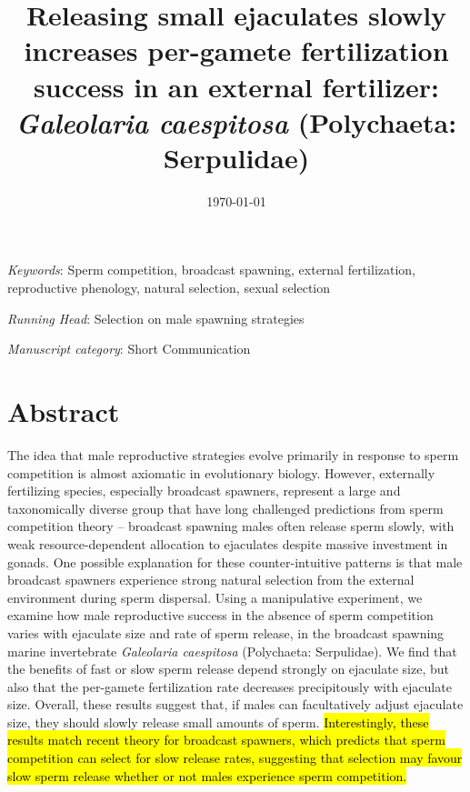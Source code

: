 \documentclass{article}
\title{Releasing small ejaculates slowly increases per-gamete fertilization success in an external fertilizer: \textit{Galeolaria caespitosa} (Polychaeta: Serpulidae)}
\date{\today}
\begin{document}
\maketitle




\noindent{} \textit{Keywords}: Sperm competition, broadcast spawning, external fertilization, reproductive phenology, natural selection, sexual selection
\bigskip

\noindent{} \textit{Running Head}: Selection on male spawning strategies

\bigskip

\noindent{} \textit{Manuscript category}: Short Communication

\bigskip


\linenumbers
\modulolinenumbers[1]
\renewcommand\linenumberfont{\normalfont\small}
\newpage{}



\section{Abstract}

\noindent{} The idea that male reproductive strategies evolve primarily in response to sperm competition is almost axiomatic in evolutionary biology. However, externally fertilizing species, especially broadcast spawners, represent a large and taxonomically diverse group that have long challenged predictions from sperm competition theory -- broadcast spawning males often release sperm slowly, with weak resource-dependent allocation to ejaculates despite massive investment in gonads. One possible explanation for these counter-intuitive patterns is that male broadcast spawners experience strong natural selection from the external environment during sperm dispersal. Using a manipulative experiment, we examine how male reproductive success in the absence of sperm competition varies with ejaculate size and rate of sperm release, in the broadcast spawning marine invertebrate \textit{Galeolaria caespitosa} (Polychaeta: Serpulidae). We find that the benefits of fast or slow sperm release depend strongly on ejaculate size, but also that the per-gamete fertilization rate decreases precipitously with ejaculate size. Overall, these results suggest that, if males can facultatively adjust ejaculate size, they should slowly release small amounts of sperm. \hl{Interestingly, these results match recent theory for broadcast spawners, which predicts that sperm competition can select for slow release rates, suggesting that selection may favour slow sperm release whether or not males experience sperm competition.}
\end{document}
